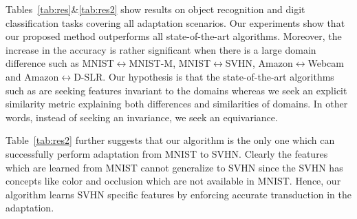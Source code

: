 \begin{table}
\vspace{-2mm}
\setlength{\tabcolsep}{3pt}
\caption{Accuracy on the digit classification task.}
\vspace{-2mm}
\label{tab:res2}
\begin{sc}
\begin{small}
\end{small}
\end{sc}
\vspace{-2mm}
\end{table}

Tables~\ref{tab:res}\&\ref{tab:res2} show results on object recognition and digit classification tasks covering all adaptation scenarios. Our experiments show that our proposed method outperforms all state-of-the-art algorithms. Moreover, the increase in the accuracy is rather significant when there is a large domain difference such as \mbox{MNIST$\leftrightarrow$MNIST-M}, \mbox{MNIST$\leftrightarrow$SVHN}, Amazon$\leftrightarrow$Webcam and Amazon$\leftrightarrow$D-SLR. Our hypothesis is that the state-of-the-art algorithms such as \cite{ganin15} are seeking features invariant to the domains whereas we seek an explicit similarity metric explaining both differences and similarities of domains. In other words, instead of seeking an invariance, we seek an equivariance. %

Table~\ref{tab:res2} further suggests that our algorithm is the only one which can successfully perform adaptation from MNIST to SVHN. Clearly the features which are learned from MNIST cannot generalize to SVHN since the SVHN has concepts like color and occlusion which are not available in MNIST. Hence, our algorithm learns SVHN specific features by enforcing accurate transduction in the adaptation.

